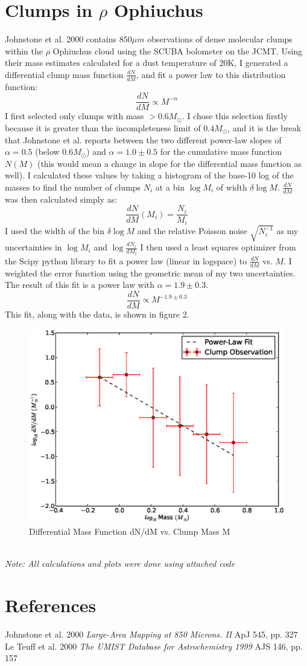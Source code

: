\documentclass{article}
\begin{document}
\section{Clumps in $\rho$ Ophiuchus}
Johnstone et al. 2000 contains $850 \mu m$ observations of dense 
molecular clumps within the $\rho$ Ophiuchus cloud using the 
SCUBA bolometer on the JCMT.  Using their mass estimates calculated
for a dust temperature of 20K, I generated a differential clump
mass function $\frac{dN}{dM}$, and fit a power law to this distribution
function:
$$\frac{dN}{dM} \propto M^{-\alpha}$$
I first selected only clumps with mass $>0.6M_\odot$.  I chose this selection
firstly because it is greater than the incompleteness limit of $0.4M_\odot$, and
it is the break that Johnstone et al. reports between the two different
power-law slopes of $\alpha=0.5$ (below $0.6M_\odot$) and $\alpha=1.0\pm0.5$
for the cumulative mass function $N(M)$ (this would mean a change in slope for
the differential mass function as well).
I calculated these values by taking a histogram of the base-10 log of the masses
to find the number of clumps $N_i$ at a bin $\log M_i$ of width $\delta \log M$.
$\frac{dN}{dM}$ was then calculated simply as:
$$\frac{dN}{dM}(M_i) = \frac{N_i}{M_i}$$
I used the width of the bin $\delta \log M$ and the relative Poisson noise
$\sqrt{N_i^{-1}}$ as my uncertainties in $\log M_i$ and $\log \frac{dN_i}{dM_i}$
I then used a least squares optimizer from the Scipy python library to fit a
power law (linear in logspace) to $\frac{dN}{dM}$ vs. $M$.  I weighted the
error function using the geometric mean of my two uncertainties.
The result of this fit is a power law with $\alpha = 1.9 \pm 0.3$.
$$\frac{dN}{dM} \propto M^{-1.9\pm 0.3}$$
This fit, along with the data, is shown in figure 2.
\begin{figure}
	\includegraphics[scale=0.8]{clumpmass.eps}
	\caption{Differential Mass Function dN/dM vs. Clump Mass M}
\end{figure}\\
\textit{Note: All calculations and plots were done using attached code}
\section*{References}
Johnstone et al. 2000 \textit{Large-Area Mapping at 850 Microns. II} ApJ 545,
pp. 327\\
Le Teuff et al. 2000 \textit{The UMIST Database for Astrochemistry 1999} AJS
146, pp. 157\\
\\
\\
\end{document}
